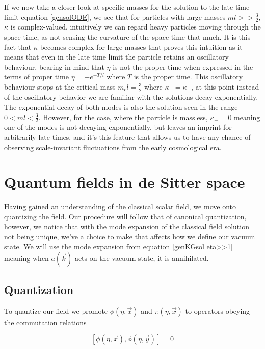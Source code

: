 \documentclass[a4paper,11pt]{article}
\numberwithin{equation}{section}
\numberwithin{figure}{section}
\begin{document}
\begin{large}
If we now take a closer look at specific masses for the solution to the late time limit equation \eqref{gensolODE}, we see that for particles with large masses  $ml>>\frac{3}{2}$, $\kappa$ is complex-valued, intuitively we can regard heavy particles moving through the space-time, as not sensing the curvature of the space-time that much. It is this fact that $\kappa$ becomes complex for large masses that proves this intuition as it means that even in the late time limit the particle retains an oscillatory behaviour, bearing in mind that $\eta$ is not the proper time when expressed in the terms of proper time $\eta=-e^{-T/l}$ where $T$ is the proper time. This oscillatory behaviour stops at the critical mass $m_cl=\frac{3}{2}$ where $\kappa_+=\kappa_-$, at this point instead of the oscillatory behavior we are familiar with the solutions decay exponentially. The exponential decay of both modes is also the solution seen in the range $0<ml<\frac{3}{2}$. However, for the case, where the particle is massless, $\kappa_-=0$ meaning one of the modes is not decaying exponentially, but leaves an imprint for arbitrarily late times, and it's this feature that allows us to have any chance of observing scale-invariant fluctuations from the early cosmological era.




\newpage

\section{Quantum fields in de Sitter space}

Having gained an understanding of the classical scalar field, we move onto quantizing the field. Our procedure will follow that of canonical quantization,
however, we notice that with the mode expansion of the classical field solution not being unique, we've a choice to make that affects how we define our vacuum state. We will use the mode expansion from equation \eqref{genKGsol eta>>1} meaning when $a(\Vec{k})$ acts on the vacuum state, it is annihilated.


\subsection{Quantization}


To quantize our field we promote $\phi(\eta,\Vec{x})$ and $\pi(\eta,\Vec{x})$ to operators obeying the commutation relations

\begin{equation}
\label{cc1}
    [\phi(\eta,\Vec{x}),\phi(\eta,\Vec{y})]=0
\end{equation}


\end{large}
\end{document}
